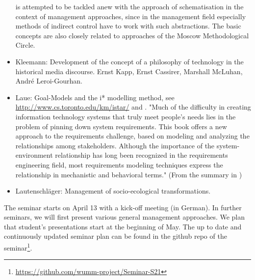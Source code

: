 \documentclass[11pt,a4paper]{article}
\begin{document}
\begin{itemize}
  is attempted to be tackled anew with the approach of schematisation in the
  context of management approaches, since in the management field especially
  methods of indirect control have to work with such abstractions. The basic
  concepts are also closely related to approaches of the Moscow Methodological
  Circle.
\item Kleemann: Development of the concept of a philosophy of technology in
  the historical media discourse.  Ernst Kapp, Ernst Cassirer, Marshall
  McLuhan, André Leroi-Gourhan.\enlargethispage{1em}
\item Laue: Goal-Models and the i* modelling method, see
  \url{http://www.cs.toronto.edu/km/istar/} and \cite{Yu2010}.  "Much of the
  difficulty in creating information technology systems that truly meet
  people's needs lies in the problem of pinning down system requirements. This
  book offers a new approach to the requirements challenge, based on modeling
  and analyzing the relationships among stakeholders. Although the importance
  of the system-environment relationship has long been recognized in the
  requirements engineering field, most requirements modeling techniques
  express the relationship in mechanistic and behavioral terms." (From the
  summary in \cite{Yu2010})
\item Lautenschläger: Management of socio-ecological transformations. 
\end{itemize}

The seminar starts on April 13 with a kick-off meeting (in German).  In
further seminars, we will first present various general management approaches.
We plan that student's presentations start at the beginning of May.  The up to
date and continuously updated seminar plan can be found in the github repo of
the seminar\footnote{\url{https://github.com/wumm-project/Seminar-S21}}.
\end{document}
